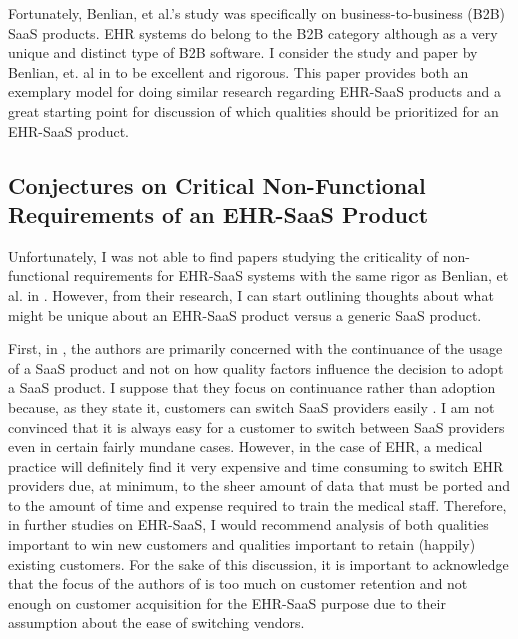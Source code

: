 \documentclass[10pt]{article}
\begin{document}
Fortunately, Benlian, et al.'s study was specifically on business-to-business (B2B) SaaS products. 
EHR systems do belong to the B2B category although as a very unique and distinct type of B2B software.
I consider the study and paper by Benlian, et. al in \cite{saasqual} to be excellent and rigorous.
This paper provides both an exemplary model for doing similar research regarding EHR-SaaS products and a great starting point for discussion of which qualities should be prioritized for an EHR-SaaS product.


\subsection{Conjectures on Critical Non-Functional Requirements of an EHR-SaaS Product}
\label{sec:Critical-EHR-Ilities}

Unfortunately, I was not able to find papers studying the criticality of non-functional requirements for EHR-SaaS systems with the same rigor as Benlian, et al. in \cite{saasqual}.
However, from their research, I can start outlining thoughts about what might be unique about an EHR-SaaS product versus a generic SaaS product.

First, in \cite{saasqual}, the authors are primarily concerned with the continuance of the usage of a SaaS product and not on how quality factors influence the decision to adopt a SaaS product.
I suppose that they focus on continuance rather than adoption because, as they state it, customers can switch SaaS providers easily \cite{saasqual}. 
I am not convinced that it is always easy for a customer to switch between SaaS providers even in certain fairly mundane cases.
However, in the case of EHR, a medical practice will definitely find it very expensive and time consuming to switch EHR providers due, at minimum, to the sheer amount of data that must be ported and to the amount of time and expense required to train the medical staff.
Therefore, in further studies on EHR-SaaS, I would recommend analysis of both qualities important to win new customers and qualities important to retain (happily) existing customers.
For the sake of this discussion, it is important to acknowledge that the focus of the authors of \cite{saasqual} is too much on customer retention and not enough on customer acquisition for the EHR-SaaS purpose due to their assumption about the ease of switching vendors.
\end{document}

